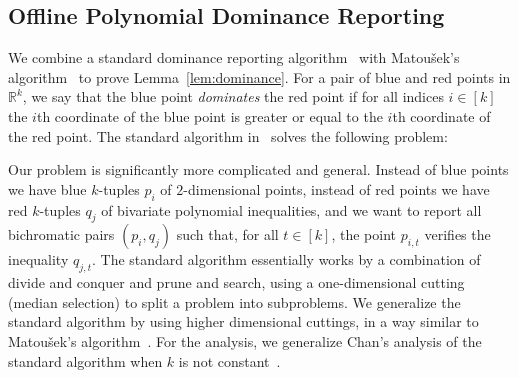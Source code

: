 \subsection{Offline Polynomial Dominance Reporting}%
\label{sec:algo:dominance}


We combine a standard dominance reporting
algorithm~\cite{PS85} with Matou\v{s}ek's algorithm~\cite{Ma93} to prove
Lemma~\ref{lem:dominance}.
For a pair of blue and red points in $\mathbb{R}^k$, we say that the blue point
\emph{dominates} the red point if for all indices $i\in[k]$ the $i$th
coordinate of the blue point is greater or equal to the $i$th coordinate of the
red point.
The standard algorithm in~\cite{PS85} solves the following problem:
%

%
Our problem is significantly more complicated and general. Instead of blue points we
have blue $k$-tuples $p_i$ of $2$-dimensional points, instead of red points we have
red $k$-tuples $q_j$ of bivariate polynomial inequalities, and we want to report
all bichromatic pairs $(p_i,q_j)$ such that, for all $t \in [k]$,
the point $p_{i,t}$ verifies the inequality $q_{j,t}$.
The standard algorithm essentially works by a combination of divide and conquer
and prune and search, using a one-dimensional cutting (median selection) to
split a problem into subproblems. We generalize the standard algorithm by using
higher dimensional cuttings, in a way similar to Matou\v{s}ek's
algorithm~\cite{Ma93}. For the analysis, we generalize Chan's analysis
of the standard algorithm when $k$ is not constant~\cite{Cha08}.

